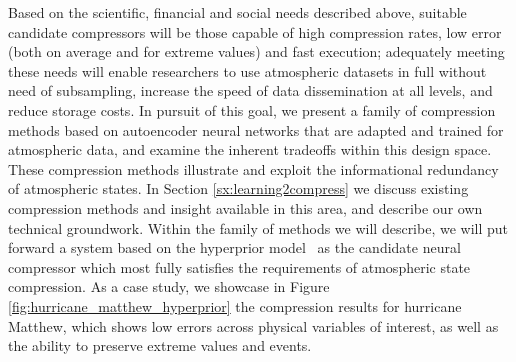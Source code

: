 
Based on the scientific, financial and social needs described above, suitable candidate compressors will be those capable of high compression rates, low error (both on average and for extreme values) and fast execution; %
adequately meeting these needs will enable researchers to use atmospheric datasets in full without need of subsampling, increase the speed of data dissemination at all levels, and reduce storage costs.
In pursuit of this goal, we present a family of compression methods based on autoencoder neural networks that are adapted and trained for atmospheric data, and examine the inherent tradeoffs within this design space.
These compression methods illustrate and exploit the informational redundancy of atmospheric states.
In Section \ref{sx:learning2compress} we discuss existing compression methods and insight available in this area, and describe our own technical groundwork.
Within the family of methods we will describe, we will put forward a system based on the hyperprior model~\citep{balle2018hp} as the candidate neural compressor which most fully satisfies the requirements of atmospheric state compression.
As a case study, we showcase in Figure \ref{fig:hurricane_matthew_hyperprior} the compression results for hurricane Matthew, which shows low errors across physical variables of interest, as well as the ability to preserve extreme values and events.  

